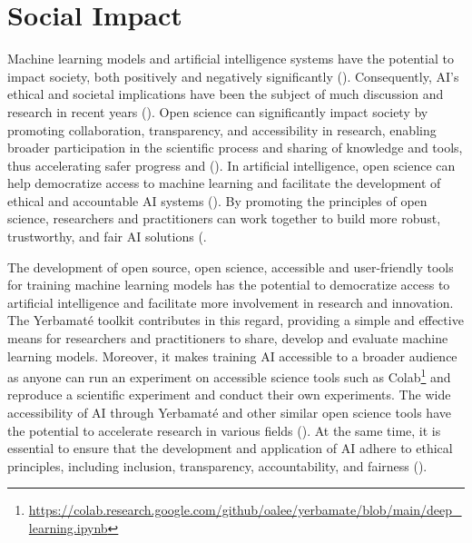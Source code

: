 
\section{Social Impact}
Machine learning models and artificial intelligence systems have the potential to impact society, both positively and negatively significantly (\cite{mittelstadt2019principles, jobin2019global,arrieta2020explainable, floridi2018ai4people}). Consequently, AI's ethical and societal implications have been the subject of much discussion and research in recent years (\cite{floridi2018ai4people, goodman2017european, floridi2019establishing, mittelstadt2016ethics}).
Open science can significantly impact society by promoting collaboration, transparency, and accessibility in research, enabling broader participation in the scientific process and sharing of knowledge and tools, thus accelerating safer progress and (\cite{kocak2022transparency, wachter2017transparent, coro2020open, braun2018open, paton2019open, goodman2017european}). 
In artificial intelligence, open science can help democratize access to machine learning and facilitate the development of ethical and accountable AI systems (\cite{goodman2017european, batarseh2020data}). By promoting the principles of open science, researchers and practitioners can work together to build more robust, trustworthy, and fair AI solutions (\cite{accountabilityInAi, kocak2022transparency,wachter2017transparent, coro2020open, braun2018open, hicks2021open, goodman2017european}.

The development of open source, open science, accessible and user-friendly tools for training machine learning models has the potential to democratize access to artificial intelligence and facilitate more involvement in research and innovation. The Yerbamaté toolkit contributes in this regard, providing a simple and effective means for researchers and practitioners to share, develop and evaluate machine learning models. Moreover, it makes training AI accessible to a broader audience as anyone can run an experiment on accessible science tools such as Colab\footnote{\url{https://colab.research.google.com/github/oalee/yerbamate/blob/main/deep_learning.ipynb}} and reproduce a scientific experiment and conduct their own experiments.
The wide accessibility of AI through Yerbamaté and other similar open science tools have the potential to accelerate research in various fields (\cite{olson2018system, wolf2020designing,morris2020ai,ong2021guide, li2018can}). 
At the same time, it is essential to ensure that the development and application of AI adhere to ethical principles, including inclusion, transparency, accountability, and fairness (\cite{ accountabilityInAi,  jobin2019global, floridi2018ai4people, wachter2017transparent, arrieta2020explainable, mittelstadt2019principles, goodman2017european, mittelstadt2016ethics, floridi2019establishing, o2017weapons}).

